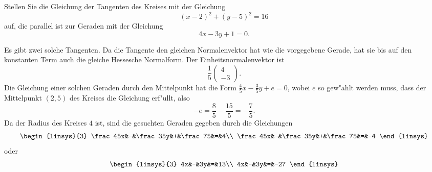 Stellen Sie die Gleichung der Tangenten des Kreises mit der Gleichung
\[
(x-2)^2+(y-5)^2=16
\]
auf, die parallel ist zur Geraden mit der Gleichung
\[
4x-3y+1=0.
\]

\begin{loesung}
Es gibt zwei solche Tangenten. Da die Tangente den gleichen Normalenvektor
hat wie die vorgegebene Gerade, hat sie bis auf den konstanten Term
auch die gleiche Hessesche Normalform. Der Einheitsnormalenvektor
ist
\[
\frac15\begin{pmatrix}4\\-3\end{pmatrix}.
\]
Die Gleichung einer solchen Geraden durch den Mittelpunkt hat
die Form $\frac45x-\frac35y+e=0$, wobei $e$ so gew"ahlt werden
muss, dass der Mittelpunkt $(2,5)$ des Kreises die Gleichung
erf"ullt, also
\[
-e=\frac85-\frac{15}5=-\frac75.
\]
Da der Radius des Kreises $4$ ist, sind die gesuchten Geraden gegeben
durch die Gleichungen
\[
\begin{linsys}{3}
\frac45x&-&\frac35y&+&\frac75&=&4\\
\frac45x&-&\frac35y&+&\frac75&=&-4
\end{linsys}
\]
oder
\[
\begin{linsys}{3}
4x&-&3y&=&13\\
4x&-&3y&=&-27
\end{linsys}
\]
\end{loesung}
